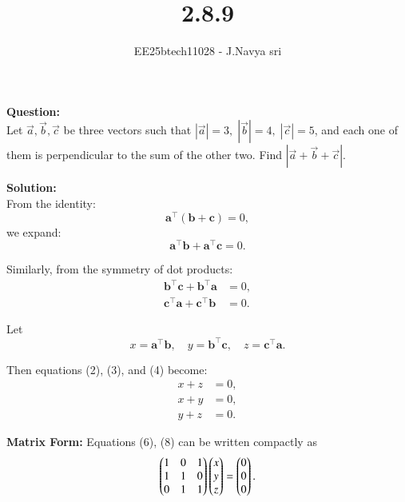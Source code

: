 \documentclass[journal]{IEEEtran}
\begin{document}

\vspace{3cm}

\title{2.8.9}
\author{EE25btech11028 - J.Navya sri}
{\let\newpage\relax\maketitle}


\textbf{Question:} \\
Let $\vec{a}, \vec{b}, \vec{c}$ be three vectors such that 
$|\vec{a}|=3,\; |\vec{b}|=4,\; |\vec{c}|=5$, and each one of them is perpendicular to the sum of the other two. 
Find $|\vec{a}+\vec{b}+\vec{c}|$.

\textbf{Solution:} \\
From the identity:
\begin{equation} \label{eq1}
\mathbf{a}^\top(\mathbf{b} + \mathbf{c}) = 0,
\end{equation}
we expand:
\begin{equation} \label{eq2}
\mathbf{a}^\top \mathbf{b} + \mathbf{a}^\top \mathbf{c} = 0.
\end{equation}

Similarly, from the symmetry of dot products:
\begin{align}
\mathbf{b}^\top \mathbf{c} + \mathbf{b}^\top \mathbf{a} &= 0, \label{eq3} \\
\mathbf{c}^\top \mathbf{a} + \mathbf{c}^\top \mathbf{b} &= 0. \label{eq4}
\end{align}

Let
\begin{equation} \label{eq5}
x = \mathbf{a}^\top \mathbf{b}, \quad y = \mathbf{b}^\top \mathbf{c}, \quad z = \mathbf{c}^\top \mathbf{a}.
\end{equation}

Then equations (2), (3), and (4) become:
\begin{align}
x + z &= 0, \label{eq6} \\
x + y &= 0, \label{eq7} \\
y + z &= 0. \label{eq8}
\end{align}

\bigskip

\noindent
\textbf{Matrix Form:}  
Equations (6), (8) can be written compactly as
\[
\begin{pmatrix}
1 & 0 & 1 \\
1 & 1 & 0 \\
0 & 1 & 1
\end{pmatrix}
\begin{pmatrix}
x \\ y \\ z
\end{pmatrix}
=
\begin{pmatrix}
0 \\ 0 \\ 0
\end{pmatrix}.
\]
\end{document}
